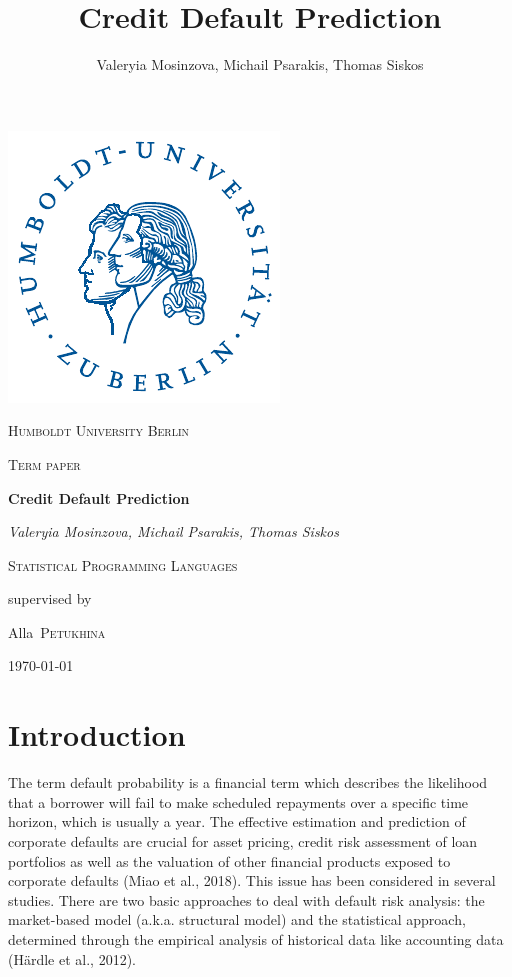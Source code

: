 \documentclass{article}
\title{Credit Default Prediction}
\author{Valeryia Mosinzova, Michail Psarakis, Thomas Siskos}
\date{ }
\begin{document}
\begin{titlepage}
  \begin{center}
  
  \includegraphics[scale=1.25]{hulogo.pdf} \par\vspace{1cm}
  {\scshape\LARGE Humboldt University Berlin \par}
  \vspace{1cm}
  {\scshape\Large Term paper\par}
  \vspace{1.5cm}
  {\huge\bfseries Credit Default Prediction\par}
  \vspace{1cm}
  {\Large\itshape Valeryia Mosinzova, Michail Psarakis, Thomas Siskos \par}
  \vspace{1cm}
  {\Large\scshape Statistical Programming Languages\par}
  \vspace{1cm}
  \vfill
  supervised by \par
  {\Large Alla~\scshape Petukhina \par}
  \vfill
  {\large \today\par}
  \end{center}
\end{titlepage}

\tableofcontents
\newpage

\listoftables
\listoffigures
\listofalgorithms
\newpage

\section{Introduction}

The term default probability is a financial term which describes the likelihood that a borrower will fail to make scheduled repayments over a specific time horizon, 
which is usually a year. The effective estimation and prediction of corporate defaults are crucial for asset pricing, credit risk assessment of loan portfolios as 
well as the valuation of other financial products exposed to corporate defaults (Miao et al., 2018). This issue has been considered in several studies. There are two 
basic approaches to deal with default risk analysis: the market-based model (a.k.a. structural model) and the statistical approach, determined through the empirical 
analysis of historical data like accounting data (H{\"a}rdle et al., 2012).
\end{document}
